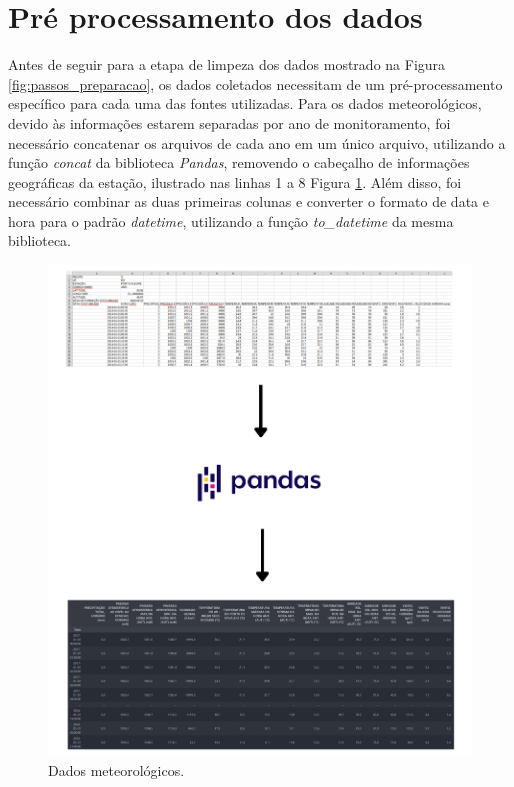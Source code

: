 \section{Pré processamento dos dados}

Antes de seguir para a etapa de limpeza dos dados mostrado na Figura \ref{fig:passos_preparacao}, os dados coletados necessitam de um pré-processamento específico para cada uma das fontes utilizadas. Para os dados meteorológicos, devido às informações estarem separadas por ano de monitoramento, foi necessário concatenar os arquivos de cada ano em um único arquivo, utilizando a função \textit{concat} da biblioteca \textit{Pandas}, removendo o cabeçalho de informações geográficas da estação, ilustrado nas linhas 1 a 8 Figura \ref{fig:base_inmet}. Além disso, foi necessário combinar as duas primeiras colunas e converter o formato de data e hora para o padrão \textit{datetime}, utilizando a função \textit{to\_datetime} da mesma biblioteca. 

\begin{figure}[H]
	\caption{\label{fig:base_inmet}Dados meteorológicos.}
	\begin{center}
		\includegraphics[scale=0.5]{figuras/base_inmet.png}
	\end{center}
\end{figure}

